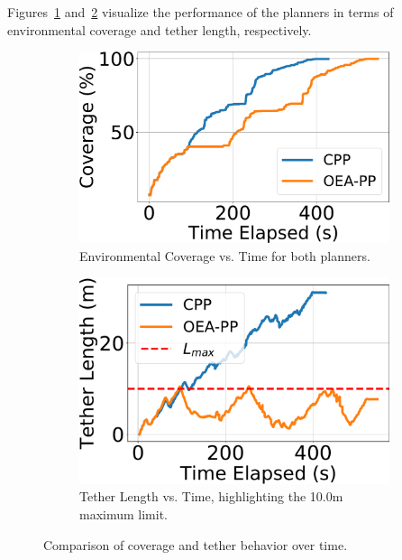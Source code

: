 Figures~\ref{fig:coverage_vs_time} and~\ref{fig:tether_vs_time} visualize the performance of the planners in terms of environmental coverage and tether length, respectively.

\begin{figure}[ht]
    \centering
    \begin{subfigure}[b]{0.48\linewidth}
        \centering
        \includegraphics[width=\linewidth]{figures/coverage_vs_time.pdf}
        \caption{Environmental Coverage vs. Time for both planners.}
        \label{fig:coverage_vs_time}
    \end{subfigure}
    \hfill
    \begin{subfigure}[b]{0.48\linewidth}
        \centering
        \includegraphics[width=\linewidth]{figures/tether_length_vs_time.pdf}
        \caption{Tether Length vs. Time, highlighting the 10.0m maximum limit.}
        \label{fig:tether_vs_time}
    \end{subfigure}
    \caption{Comparison of coverage and tether behavior over time.}
    \label{fig:coverage_tether_sidebyside}
\end{figure}


